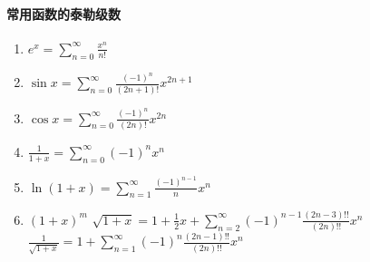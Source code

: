 \documentclass[UTF8,a4paper,12pt,scheme=chinese]{ctexart}
\begin{document}
	\paragraph{常用函数的泰勒级数}
\begin{enumerate}
			\item $\displaystyle
			e^x=\sum_{n=0}^{\infty}\frac{x^n}{n!}$
			\item $\displaystyle
			\sin x = \sum_{n=0}^{\infty}\frac{(-1)^n}{(2n+1)!}x^{2n+1}$
			\item $\displaystyle
			\cos x = \sum_{n=0}^{\infty}\frac{(-1)^n}{(2n)!}x^{2n}$
			\item $\displaystyle
			\frac{1}{1+x} = \sum_{n=0}^{\infty}(-1)^nx^n$
			\item $\displaystyle
			\ln(1+x) = \sum_{n=1}^{\infty}\frac{(-1)^{n-1}}{n}x^n$
			\item $(1+x)^m$
			\subitem $\displaystyle\sqrt{1+x} = 1 + \frac{1}{2}x + \sum_{n=2}^{\infty}(-1)^{n-1}\frac{(2n-3)!!}{(2n)!!}x^n$
			\subitem $\displaystyle
			\frac{1}{\sqrt{1+x}} = 1 + \sum_{n=1}^{\infty}(-1)^{n}\frac{(2n-1)!!}{(2n)!!}x^n$
		\end{enumerate}
\end{document}
